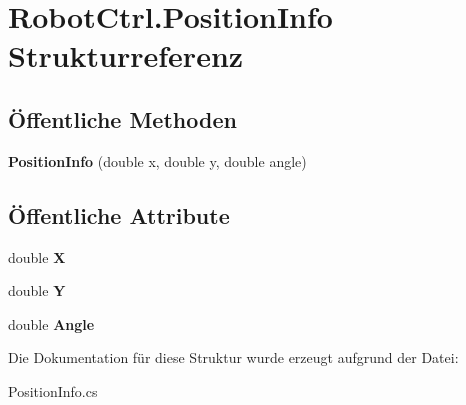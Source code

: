 \hypertarget{struct_robot_ctrl_1_1_position_info}{
\section{RobotCtrl.PositionInfo Strukturreferenz}
\label{struct_robot_ctrl_1_1_position_info}
}
\subsection*{Öffentliche Methoden}
\begin{DoxyCompactItemize}
\item 
\hypertarget{struct_robot_ctrl_1_1_position_info_a437f826ea5eb342dc35bdf9100c38b69}{
{\bfseries PositionInfo} (double x, double y, double angle)}
\label{struct_robot_ctrl_1_1_position_info_a437f826ea5eb342dc35bdf9100c38b69}

\end{DoxyCompactItemize}
\subsection*{Öffentliche Attribute}
\begin{DoxyCompactItemize}
\item 
\hypertarget{struct_robot_ctrl_1_1_position_info_a004e97e7977e8a19966104d0d1f3de84}{
double {\bfseries X}}
\label{struct_robot_ctrl_1_1_position_info_a004e97e7977e8a19966104d0d1f3de84}

\item 
\hypertarget{struct_robot_ctrl_1_1_position_info_a4e06789a38efca8072df7b9f21cd552e}{
double {\bfseries Y}}
\label{struct_robot_ctrl_1_1_position_info_a4e06789a38efca8072df7b9f21cd552e}

\item 
\hypertarget{struct_robot_ctrl_1_1_position_info_a12ed93794ca7fc28db9b5ce3afb53da3}{
double {\bfseries Angle}}
\label{struct_robot_ctrl_1_1_position_info_a12ed93794ca7fc28db9b5ce3afb53da3}

\end{DoxyCompactItemize}


Die Dokumentation für diese Struktur wurde erzeugt aufgrund der Datei:\begin{DoxyCompactItemize}
\item 
PositionInfo.cs\end{DoxyCompactItemize}
